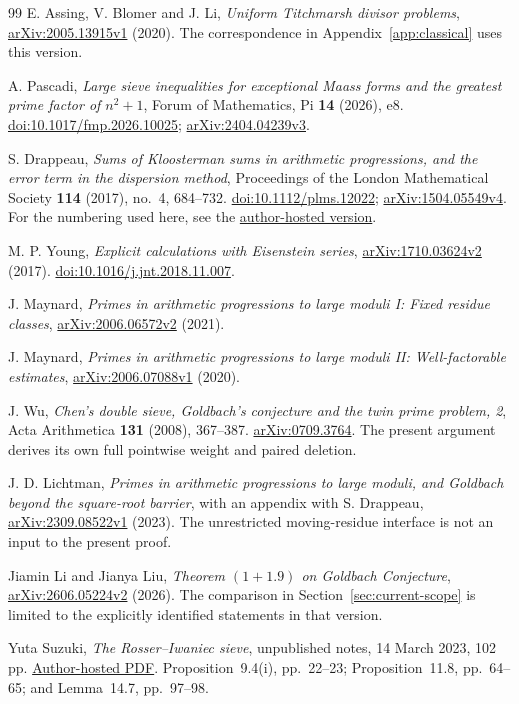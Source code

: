 \begin{thebibliography}{99}
 E. Assing, V. Blomer and J. Li,
\emph{Uniform Titchmarsh divisor problems},
\href{https://arxiv.org/abs/2005.13915v1}{arXiv:2005.13915v1} (2020).
The correspondence in Appendix~\ref{app:classical} uses this version.

 A. Pascadi,
\emph{Large sieve inequalities for exceptional Maass forms and the greatest
prime factor of $n^2+1$}, Forum of Mathematics, Pi \textbf{14} (2026), e8.
\href{https://doi.org/10.1017/fmp.2026.10025}{doi:10.1017/fmp.2026.10025};
\href{https://arxiv.org/abs/2404.04239v3}{arXiv:2404.04239v3}.

 S. Drappeau,
\emph{Sums of Kloosterman sums in arithmetic progressions, and the error term
in the dispersion method}, Proceedings of the London Mathematical Society
\textbf{114} (2017), no.~4, 684--732.
\href{https://doi.org/10.1112/plms.12022}{doi:10.1112/plms.12022};
\href{https://arxiv.org/abs/1504.05549v4}{arXiv:1504.05549v4}.
For the numbering used here, see the
\href{https://drappeau.perso.math.cnrs.fr/documents/divtm-siegel.pdf}{author-hosted version}.

 M. P. Young,
\emph{Explicit calculations with Eisenstein series},
\href{https://arxiv.org/abs/1710.03624v2}{arXiv:1710.03624v2} (2017).
\href{https://doi.org/10.1016/j.jnt.2018.11.007}{doi:10.1016/j.jnt.2018.11.007}.

 J. Maynard,
\emph{Primes in arithmetic progressions to large moduli I: Fixed residue classes},
\href{https://arxiv.org/abs/2006.06572v2}{arXiv:2006.06572v2} (2021).

 J. Maynard,
\emph{Primes in arithmetic progressions to large moduli II: Well-factorable estimates},
\href{https://arxiv.org/abs/2006.07088v1}{arXiv:2006.07088v1} (2020).

 J. Wu,
\emph{Chen's double sieve, Goldbach's conjecture and the twin prime problem, 2},
Acta Arithmetica \textbf{131} (2008), 367--387.
\href{https://arxiv.org/abs/0709.3764}{arXiv:0709.3764}.
The present argument derives its own full pointwise weight and paired deletion.

 J. D. Lichtman,
\emph{Primes in arithmetic progressions to large moduli, and Goldbach
beyond the square-root barrier}, with an appendix with S. Drappeau,
\href{https://arxiv.org/abs/2309.08522v1}{arXiv:2309.08522v1} (2023).
The unrestricted moving-residue interface is not an input to the present proof.

 Jiamin Li and Jianya Liu,
\emph{Theorem $(1+1.9)$ on Goldbach Conjecture},
\href{https://arxiv.org/abs/2606.05224v2}{arXiv:2606.05224v2} (2026).
The comparison in Section~\ref{sec:current-scope} is limited to the
explicitly identified statements in that version.

 Yuta Suzuki,
\emph{The Rosser--Iwaniec sieve}, unpublished notes, 14 March 2023, 102 pp.
\href{https://www.suzuyu1729.com/notes/NagoyaSeminar2022/RosserIwaniec.pdf}{Author-hosted PDF}.
Proposition~9.4(i), pp.~22--23; Proposition~11.8, pp.~64--65;
and Lemma~14.7, pp.~97--98.
\end{thebibliography}
